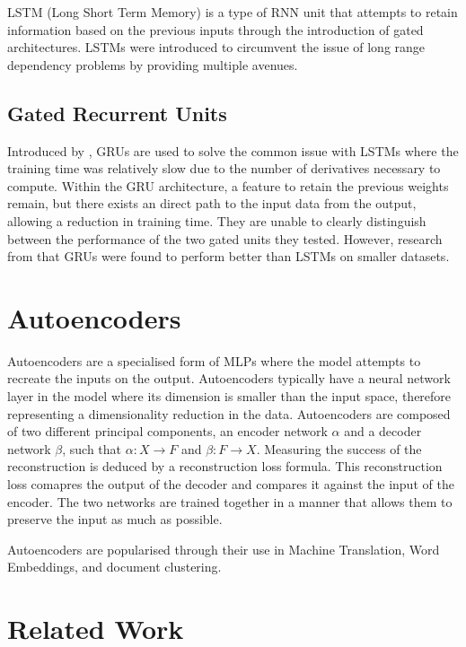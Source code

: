 \documentclass[12pt,twoside]{report}
\begin{document}
LSTM (Long Short Term Memory) is a type of RNN unit that attempts to retain information based on the previous inputs through the introduction of gated architectures. LSTMs were introduced to circumvent the issue of long range dependency problems by providing multiple avenues.

\subsection{Gated Recurrent Units}

Introduced by \cite{cho_properties_2014}, GRUs are used to solve the common issue with LSTMs where the training time was relatively slow due to the number of derivatives necessary to compute. Within the GRU architecture, a feature to retain the previous weights remain, but there exists an direct path to the input data from the output, allowing a reduction in training time. They are unable to clearly distinguish between the performance of the two gated units they tested.
However, research from \cite{chung_empirical_2014} that GRUs were found to perform better than LSTMs on smaller datasets. 

\section{Autoencoders}

Autoencoders are a specialised form of MLPs where the model attempts to recreate the inputs on the output. Autoencoders typically have a neural network layer in the model where its dimension is smaller than the input space, therefore representing a dimensionality reduction in the data. Autoencoders are composed of two different principal components, an encoder network $\alpha$ and a decoder network $\beta$, such that $\alpha : X \rightarrow F$ and $\beta : F \rightarrow X$. Measuring the success of the reconstruction is deduced by a reconstruction loss formula. This reconstruction loss comapres the output of the decoder and compares it against the input of the encoder. The two networks are trained together in a manner that allows them to preserve the input as much as possible.

Autoencoders are popularised through their use in Machine Translation, Word Embeddings, and document clustering.


\section{Related Work}
\end{document}
